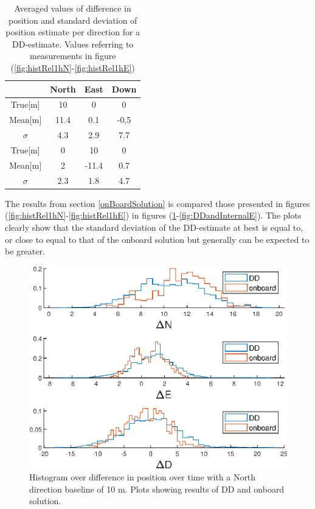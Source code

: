 \begin{table}[!htb]
  \begin{center}
    \begin{tabular}{|c|c|c|c|}\hline
		& \textbf{North} & \textbf{East}& \textbf{Down}\\
      \hline
      True[m]& 10 & 0&0\\ \hline
      Mean[m] &11.4 & 0.1 & -0,5\\ \hline
		$\sigma$& 4.3 & 2.9 & 7.7 \\\hline
		True[m] & 0 &10&0\\ \hline
		Mean[m] & 2 & -11.4 & 0.7\\ \hline
		$\sigma$ & 2.3 &1.8 & 4.7 \\
		\hline
    \end{tabular}
    \caption{\label{table:resultsRel} Averaged values of difference in position and standard deviation of position estimate per direction for a DD-estimate. Values referring to measurements in figure (\ref{fig:histRel1hN}-\ref{fig:histRel1hE})}
  \end{center}
\end{table}
The results from section \ref{onBoardSolution} is compared those presented in figures (\ref{fig:histRel1hN}-\ref{fig:histRel1hE}) in figures  (\ref{fig:DDandInternalN}-\ref{fig:DDandInternalE}). The plots clearly show that the standard deviation of the DD-estimate at best is equal to, or close to equal to that of the onboard solution but generally can be expected to be greater.
\begin{figure}[!htb]
\includegraphics[width=\textwidth]{Results/Nhist.eps}
\caption{\label{fig:DDandInternalN} Histogram over difference in position over time with a North direction baseline of 10 m. Plots showing results of DD and onboard solution.}
\end{figure}
